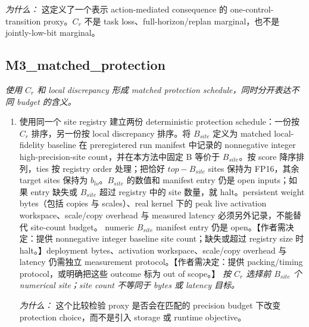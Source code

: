 \documentclass[10pt,a4paper]{article}
\begin{document}
\begin{enumerate}[leftmargin=*,start=2]
\par\emph{为什么：} 这定义了一个表示 action-mediated consequence 的 one-control-transition proxy。\(C_{r}\) 不是 task loss、full-horizon/replan marginal，也不是 jointly-low-bit marginal。
\end{enumerate}
\subsection*{M3\_matched\_protection}
\emph{使用 \(C_{r}\) 和 local discrepancy 形成 matched protection schedule，同时分开表达不同 budget 的含义。}
\begin{enumerate}[leftmargin=*,start=4]
  \item 使用同一个 site registry 建立两份 deterministic protection schedule：一份按 \(C_{r}\) 排序，另一份按 local discrepancy 排序。将 \(B_{site}\) 定义为 matched local-fidelity baseline 在 preregistered run manifest 中记录的 nonnegative integer high-precision-site count，并在本方法中固定 B 等价于 \(B_{site}\)。按 score 降序排列，ties 按 registry order 处理；把恰好 \(top-B_{site}\) sites 保持为 FP16，其余 target sites 保持为 \(b_{lo}\)。\(B_{site}\) 的数值和 manifest entry 仍是 open inputs；如果 entry 缺失或 \(B_{site}\) 超过 registry 中的 site 数量，就 halt。persistent weight bytes（包括 copies 与 scales）、real kernel 下的 peak live activation workspace、scale/copy overhead 与 measured latency 必须另外记录，不能替代 site-count budget。 numeric \(B_{site}\) manifest entry 仍是 open。【作者需决定：提供 nonnegative integer baseline site count；缺失或超过 registry size 时 halt。】deployment bytes、activation workspace、scale/copy overhead 与 latency 仍需独立 measurement protocol。【作者需决定：提供 packing/timing protocol，或明确把这些 outcome 标为 out of scope。】
\noindent\emph{按 \(C_{r}\) 选择前 \(B_{site}\) 个 numerical site；site count 不等同于 bytes 或 latency 目标。}
\par{}
\par\emph{为什么：} 这个比较检验 proxy 是否会在匹配的 precision budget 下改变 protection choice，而不是引入 storage 或 runtime objective。
\end{enumerate}
\end{document}
